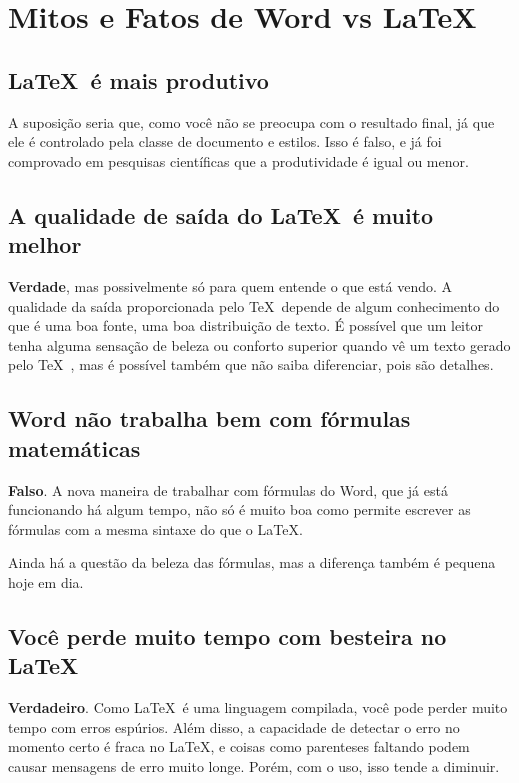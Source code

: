 \section{Mitos e Fatos de Word vs \LaTeX}


\subsection{\LaTeX\ é mais produtivo}

A suposição seria que, como você não se preocupa com o resultado final, já que ele é controlado pela classe de documento e estilos. Isso é falso, e já foi comprovado em pesquisas científicas que a produtividade é igual ou menor.

\subsection{A qualidade de saída do \LaTeX\  é muito melhor}

\textbf{Verdade}, mas possivelmente só para quem entende o que está vendo. A qualidade da saída proporcionada pelo \TeX\  depende de algum conhecimento do que é uma boa fonte, uma boa distribuição de texto. É possível que um leitor tenha alguma sensação de beleza ou conforto superior quando vê um texto gerado pelo \TeX\ , mas é possível também que não saiba diferenciar, pois são detalhes.

\subsection{Word não trabalha bem com fórmulas matemáticas}

\textbf{Falso}. A nova maneira de trabalhar com fórmulas do Word, que já está funcionando há algum tempo, não só é muito boa como permite escrever as fórmulas com a mesma sintaxe do que o \LaTeX.

Ainda há a questão da beleza das fórmulas, mas a diferença também é pequena hoje em dia.

\subsection{Você perde muito tempo com besteira no \LaTeX}

\textbf{Verdadeiro}. Como \LaTeX\ é uma linguagem compilada, você pode perder muito tempo com erros espúrios. Além disso, a capacidade de detectar o erro no momento certo é fraca no \LaTeX, e coisas como parenteses faltando podem causar mensagens de erro muito longe. Porém, com o uso, isso tende a diminuir.

